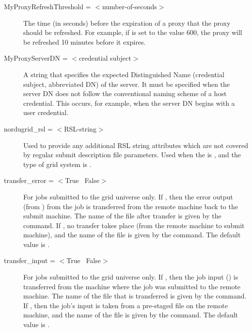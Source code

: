 \begin{description}

\item[MyProxyRefreshThreshold = $<$number-of-seconds$>$]
The time (in seconds) before the expiration of a proxy 
that the proxy should be refreshed.
For example, if  is set to the
value 600, the proxy will be refreshed 10 minutes before
it expires.


\item[MyProxyServerDN = $<$credential subject$>$]
A string that specifies the expected Distinguished Name (credential subject,
abbreviated DN)
of the  server.
It must be specified when the  server
DN does not follow the
conventional naming scheme of a host credential.
This occurs, for
example, when the   server DN begins with a user credential.



\item[nordugrid\_rsl = $<$RSL-string$>$]
Used to provide any additional RSL
string attributes which are not covered by regular submit description
file parameters. Used when the  is ,
and the type of grid system is .


\item[transfer\_error = $<$True \Bar\ False$>$]
For jobs submitted to the grid universe only.
If , then the error output (from ) from the job
is transferred from the remote machine back to the submit machine.
The name of the file after transfer is given
by the  command.
If , no transfer takes place (from the remote machine
to submit machine),
and the name of the file is given
by the  command.
The default value is .

\item[transfer\_input = $<$True \Bar\ False$>$]
For jobs submitted to the grid universe only.
If , then the job input () is transferred
from the machine where the job was submitted to the remote machine.
The name of the file that is transferred is given by the
 command.
If , then the job's input is taken from a pre-staged
file on the remote machine, and
the name of the file is given by the  command.
The default value is .


\end{description}
